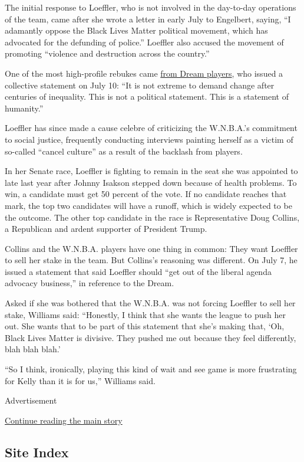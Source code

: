 The initial response to Loeffler, who is not involved in the day-to-day
operations of the team, came after she wrote a letter in early July to
Engelbert, saying, ``I adamantly oppose the Black Lives Matter political
movement, which has advocated for the defunding of police.'' Loeffler
also accused the movement of promoting ``violence and destruction across
the country.''

One of the most high-profile rebukes came
\href{https://twitter.com/moniquebillings/status/1281713112949850113?s=21}{from
Dream players}, who issued a collective statement on July 10: ``It is
not extreme to demand change after centuries of inequality. This is not
a political statement. This is a statement of humanity.''

Loeffler has since made a cause celebre of criticizing the W.N.B.A.'s
commitment to social justice, frequently conducting interviews painting
herself as a victim of so-called ``cancel culture'' as a result of the
backlash from players.

In her Senate race, Loeffler is fighting to remain in the seat she was
appointed to late last year after Johnny Isakson stepped down because of
health problems. To win, a candidate must get 50 percent of the vote. If
no candidate reaches that mark, the top two candidates will have a
runoff, which is widely expected to be the outcome. The other top
candidate in the race is Representative Doug Collins, a Republican and
ardent supporter of President Trump.

Collins and the W.N.B.A. players have one thing in common: They want
Loeffler to sell her stake in the team. But Collins's reasoning was
different. On July 7, he issued a statement that said Loeffler should
``get out of the liberal agenda advocacy business,'' in reference to the
Dream.

Asked if she was bothered that the W.N.B.A. was not forcing Loeffler to
sell her stake, Williams said: ``Honestly, I think that she wants the
league to push her out. She wants that to be part of this statement that
she's making that, `Oh, Black Lives Matter is divisive. They pushed me
out because they feel differently, blah blah blah.'

``So I think, ironically, playing this kind of wait and see game is more
frustrating for Kelly than it is for us,'' Williams said.

Advertisement

\protect\hyperlink{after-bottom}{Continue reading the main story}

\hypertarget{site-index}{%
\subsection{Site Index}\label{site-index}}

